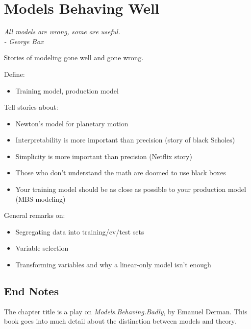 \chapter{Models Behaving Well}
\label{chapter:models}
\begin{center}
  {\Large\textit{All models are wrong, some are useful.\\ \vspace{0.1in} - George Box}}
\end{center}
\vspace{0.2in}

Stories of modeling gone well and gone wrong.

Define:
\begin{itemize}
  \item Training model, production model
\end{itemize}

Tell stories about:
\begin{itemize}
  \item Newton's model for planetary motion
  \item Interpretability is more important than precision (story of black Scholes)
  \item Simplicity is more important than precision (Netflix story)
  \item Those who don't understand the math are doomed to use black boxes
  \item Your training model should be as close as possible to your production model (MBS modeling)
\end{itemize}

General remarks on:
\begin{itemize}
  \item Segregating data into training/cv/test sets
  \item Variable selection
  \item Transforming variables and why a linear-only model isn't enough
\end{itemize}



\section{End Notes}

The chapter title is a play on \emph{Models.Behaving.Badly}, by Emanuel Derman.  This book goes into much detail about the distinction between models and theory.
